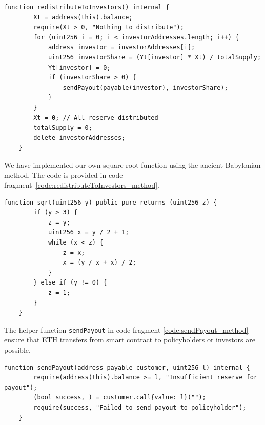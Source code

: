 \documentclass[10pt]{article}
\begin{document}
\begin{codefragment}[!h]
\begin{lstlisting}[language=Solidity]
function redistributeToInvestors() internal {
        Xt = address(this).balance;
        require(Xt > 0, "Nothing to distribute");
        for (uint256 i = 0; i < investorAddresses.length; i++) {
            address investor = investorAddresses[i];
            uint256 investorShare = (Yt[investor] * Xt) / totalSupply;
            Yt[investor] = 0;
            if (investorShare > 0) {
                sendPayout(payable(investor), investorShare);
            }
        }
        Xt = 0; // All reserve distributed
        totalSupply = 0;
        delete investorAddresses;
    }
                \end{lstlisting}
\caption{\texttt{redistributeToInvestors} method of \texttt{InsuranceLogic}}
    \label{code:redistributeToInvestors_method}
\end{codefragment}

We have implemented our own square root function using the ancient Babylonian method. The code is provided in code fragment~\ref{code:redistributeToInvestors_method}.



\begin{codefragment}[!h]
\begin{lstlisting}[language=Solidity]
function sqrt(uint256 y) public pure returns (uint256 z) {
        if (y > 3) {
            z = y;
            uint256 x = y / 2 + 1;
            while (x < z) {
                z = x;
                x = (y / x + x) / 2;
            }
        } else if (y != 0) {
            z = 1;
        }
    }
                \end{lstlisting}
\caption{\texttt{redistributeToInvestors} method of \texttt{InsuranceLogic}}
    \label{code:redistributeToInvestors_method}
\end{codefragment}

The helper function \texttt{sendPayout} in code fragment \ref{code:sendPayout_method} ensure that ETH transfers from smart contract to policyholders or investors are possible. 

\begin{codefragment}[!h]
\begin{lstlisting}[language=Solidity]
function sendPayout(address payable customer, uint256 l) internal {
        require(address(this).balance >= l, "Insufficient reserve for payout");
        (bool success, ) = customer.call{value: l}("");
        require(success, "Failed to send payout to policyholder");
    }

                    \end{lstlisting}
\caption{\texttt{sendPayout} method of \texttt{InsuranceLogic}}
    \label{code:sendPayout_method}
\end{codefragment}
\end{document}
